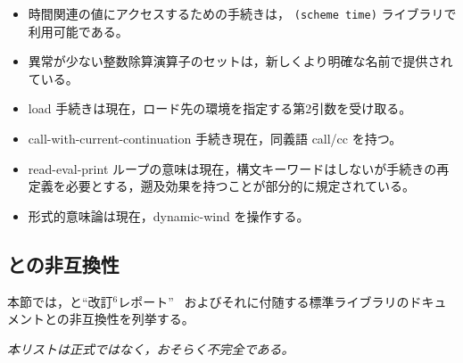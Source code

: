 \begin{itemize}
\item 時間関連の値にアクセスするための手続きは， {\tt (scheme time)} ライブラリで利用可能である。

\item 異常が少ない整数除算演算子のセットは，新しくより明確な名前で提供されている。

\item {\cf load} 手続きは現在，ロード先の環境を指定する第2引数を受け取る。

\item {\cf call-with-current-continuation} 手続き現在，同義語 {\cf call/cc} を持つ。

\item read-eval-print ループの意味は現在，構文キーワードはしないが手続きの再定義を必要とする，遡及効果を持つことが部分的に規定されている。

\item 形式的意味論は現在，{\cf dynamic-wind} を操作する。
\end{itemize}

\subsection*{\rsixrs との非互換性}
本節では，\rsevenrs と``改訂$ ^6$レポート''~\cite{R6RS} およびそれに付随する標準ライブラリのドキュメントとの非互換性を列挙する。

{\em 本リストは正式ではなく，おそらく不完全である。}

